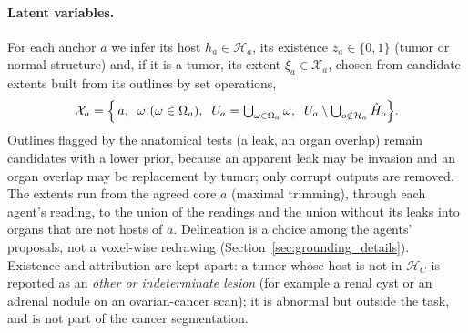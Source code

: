 \documentclass[fleqn,10pt]{olplainarticle}
\begin{document}
\paragraph{Latent variables.}
For each anchor $a$ we infer its host $h_a\in\mathcal{H}_a$, its existence $z_a\in\{0,1\}$ (tumor or normal structure)
and, if it is a tumor, its extent $\xi_a\in\mathcal{X}_a$, chosen from candidate extents built from its outlines by set
operations,
\begin{equation}
\label{eq:extents}
\mathcal{X}_a=\Bigl\{\,a,\;\;\omega\ (\omega\in\Omega_a),\;\;U_a=\textstyle\bigcup_{\omega\in\Omega_a}\omega,\;\;
U_a\setminus\bigcup_{o\notin\mathcal{H}_a}\hat H_{o}\Bigr\}.
\end{equation}
Outlines flagged by the anatomical tests (a leak, an organ overlap) remain candidates with a lower prior, because an
apparent leak may be invasion and an organ overlap may be replacement by tumor; only corrupt outputs are removed. The
extents run from the agreed core $a$ (maximal trimming), through each agent's reading, to the union of the readings and
the union without its leaks into organs that are not hosts of $a$. Delineation is a choice among the agents' proposals,
not a voxel-wise redrawing (Section~\ref{sec:grounding_details}). Existence and attribution are kept apart: a tumor whose
host is not in $\mathcal{H}_C$ is reported as an \emph{other or indeterminate lesion} (for example a renal cyst or an
adrenal nodule on an ovarian-cancer scan); it is abnormal but outside the task, and is not part of the cancer
segmentation.
\end{document}
